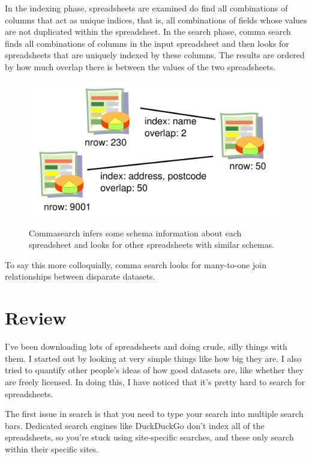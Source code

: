 \documentclass{acm_proc_article-sp}
\begin{document}
In the indexing phase, spreadsheets are examined do find all combinations of
columns that act as unique indices, that is, all combinations of fields whose
values are not duplicated within the spreadsheet. In the search phase,
comma search finds all combinations of columns in the input spreadsheet and
then looks for spreadsheets that are uniquely indexed by these columns.
The results are ordered by how much overlap there is between the values of
the two spreadsheets.

\begin{figure}
\includegraphics[width=\columnwidth]{../pagerank-for-spreadsheets/network.png}
\caption{Commasearch infers some schema information about each spreadsheet and looks for other spreadsheets with similar schemas.}
\centering
\end{figure}

To say this more colloquially, comma search looks for many-to-one join
relationships between disparate datasets.

\section{Review}
I've been downloading lots of spreadsheets and doing crude, silly things
with them.
I started out by looking at very simple things like how big they are.
I also tried to quantify other people's ideas of how good datasets are,
like whether they are freely licensed. In doing this, I have noticed that
it's pretty hard to search for spreadsheets.

The first issue in search is that you need to type your search into multiple search
bars. Dedicated search engines like DuckDuckGo don't index all of the
spreadsheets, so you're stuck using site-specific searches, and these only
search within their specific sites.
\end{document}
